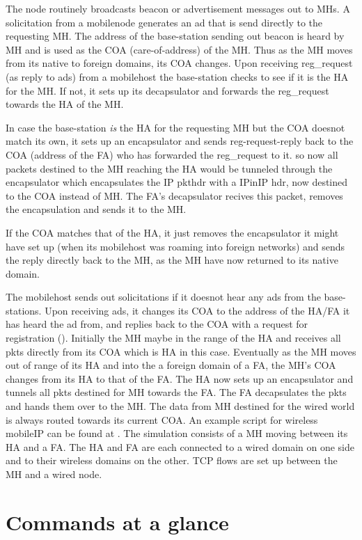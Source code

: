 The  node routinely broadcasts beacon or
advertisement messages out to MHs. A solicitation from a mobilenode
generates an ad that is send directly to the requesting MH. The
address of the base-station sending out beacon is heard by 
MH and is used as the COA (care-of-address) of the MH. Thus as the MH
moves from its native to foreign domains, its COA changes. 
Upon receiving  reg\_request (as reply to ads) from a mobilehost the
base-station checks to see if it is the HA for the MH. If not, it sets
up its decapsulator and forwards the reg\_request towards the HA of
the MH. 

In case the base-station {\em is} the HA for the requesting MH but the
COA doesnot match its own, it sets up an encapsulator and sends
reg-request-reply back to the COA (address of the FA) who has
forwarded the reg\_request to it. so now all packets destined to the
MH reaching the HA would be tunneled through the encapsulator which
encapsulates the IP pkthdr with a IPinIP hdr, now destined to the COA
instead of MH. The FA's decapsulator recives this packet, removes the
encapsulation and sends it to the MH.

If the COA matches that of the HA, it just removes the encapsulator it
might have set up (when its mobilehost was roaming into foreign
networks) and sends the reply directly back to the MH, as the MH have
now returned to its native domain.

The mobilehost sends out solicitations if it doesnot hear any ads from the
base-stations. Upon receiving ads, it changes its COA to the address of
the HA/FA it has heard the ad from, and replies back to the COA with a
request for registration ().
Initially the MH maybe in the range of the HA and receives all pkts
directly from its COA which is HA in this case. 
Eventually as the MH moves out of range of its HA and into the a foreign
domain of a FA, the MH's COA changes from its HA to that of the FA. The HA
now sets up an encapsulator and tunnels all pkts destined for MH towards
the FA. The FA decapsulates the pkts and hands them over to the MH. The
data from MH destined for the wired world is always routed towards its
current COA.  
An example script for wireless mobileIP can be found at
. The simulation consists of a MH moving
between its HA and a FA. The HA and FA are each connected to a wired
domain on one side and to their wireless domains on the other. TCP flows
are set up between the MH and a wired node. 

\section{Commands at a glance}
\label{sec:wirelesscommand}

